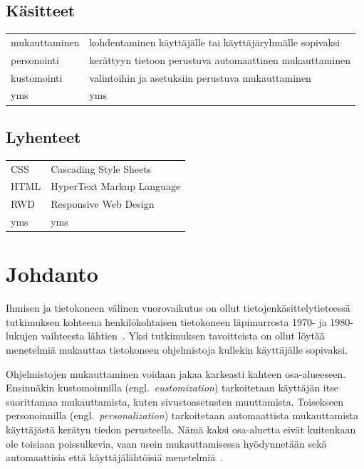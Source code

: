 \documentclass[finnish, 12pt, a4paper, elec, utf8, a-1b, online]{aaltothesis}
\date{xx.xx.2022}
\begin{document}
\makecoverpage{}

\makecopyrightpage{}

\begin{abstractpage}[finnish]
\end{abstractpage}

\thesistableofcontents{}


\subsection*{Käsitteet}

\begin{tabular}{ll}
    mukauttaminen & kohdentaminen käyttäjälle tai käyttäjäryhmälle sopivaksi \\
    personointi   & kerättyyn tietoon perustuva automaattinen mukauttaminen  \\
    kustomointi   & valintoihin ja asetuksiin perustuva mukauttaminen        \\
    yms           & yms
\end{tabular}

\subsection*{Lyhenteet}

\begin{tabular}{ll}
    CSS  & Cascading Style Sheets    \\
    HTML & HyperText Markup Language \\
    RWD  & Responsive Web Design     \\
    yms  & yms
\end{tabular}

\cleardoublepage{}

\section{Johdanto}

Ihmisen ja tietokoneen välinen vuorovaikutus on ollut tietojenkäsittelytieteessä
tutkimuksen kohteena henkilökohtaisen tietokoneen läpimurrosta 1970- ja
1980-lukujen vaihteesta lähtien~\cite{10.1145/800178.810088}. Yksi tutkimuksen
tavoitteista on ollut löytää menetelmiä mukauttaa tietokoneen ohjelmistoja
kullekin käyttäjälle sopivaksi.

Ohjelmistojen mukauttaminen voidaan jakaa karkeasti kahteen osa-alueeseen.
Ensinnäkin kustomoinnilla (engl.~\textit{customization}) tarkoitetaan käyttäjän
itse suorittamaa mukauttamista, kuten sivustoasetusten muuttamista. Toisekseen
personoinnilla (engl.~\textit{personalization}) tarkoitetaan automaattista
mukauttamista käyttäjästä kerätyn tiedon perusteella. Nämä kaksi osa-aluetta
eivät kuitenkaan ole toisiaan poissulkevia, vaan usein mukauttamisessa
hyödynnetään sekä automaattisia että käyttäjälähtöisiä
menetelmiä~\cite{10.1145/633292.633483}.
\end{document}
